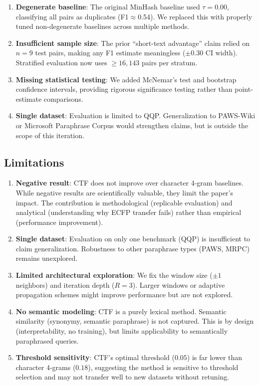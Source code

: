 \documentclass[11pt,letterpaper]{article}
\begin{document}
\begin{enumerate}
  \item \textbf{Degenerate baseline}: The original MinHash baseline used $\tau=0.00$, classifying all pairs as duplicates (F1$\approx$0.54). We replaced this with properly tuned non-degenerate baselines across multiple methods.

  \item \textbf{Insufficient sample size}: The prior ``short-text advantage'' claim relied on $n=9$ test pairs, making any F1 estimate meaningless ($\pm0.30$ CI width). Stratified evaluation now uses $\geq16{,}143$ pairs per stratum.

  \item \textbf{Missing statistical testing}: We added McNemar's test and bootstrap confidence intervals, providing rigorous significance testing rather than point-estimate comparisons.

  \item \textbf{Single dataset}: Evaluation is limited to QQP. Generalization to PAWS-Wiki or Microsoft Paraphrase Corpus would strengthen claims, but is outside the scope of this iteration.
\end{enumerate}

\subsection{Limitations}

\begin{enumerate}
  \item \textbf{Negative result}: CTF does not improve over character 4-gram baselines. While negative results are scientifically valuable, they limit the paper's impact. The contribution is methodological (replicable evaluation) and analytical (understanding why ECFP transfer fails) rather than empirical (performance improvement).

  \item \textbf{Single dataset}: Evaluation on only one benchmark (QQP) is insufficient to claim generalization. Robustness to other paraphrase types (PAWS, MRPC) remains unexplored.

  \item \textbf{Limited architectural exploration}: We fix the window size ($\pm1$ neighbors) and iteration depth ($R=3$). Larger windows or adaptive propagation schemes might improve performance but are not explored.

  \item \textbf{No semantic modeling}: CTF is a purely lexical method. Semantic similarity (synonymy, semantic paraphrase) is not captured. This is by design (interpretability, no training), but limits applicability to semantically paraphrased queries.

  \item \textbf{Threshold sensitivity}: CTF's optimal threshold ($0.05$) is far lower than character 4-grams ($0.18$), suggesting the method is sensitive to threshold selection and may not transfer well to new datasets without retuning.
\end{enumerate}
\end{document}
